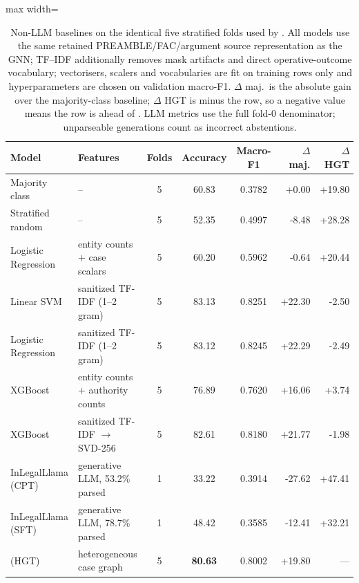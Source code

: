 \begin{table}[!htbp]
\centering
\caption{Non-LLM baselines on the identical five stratified folds used by \method{}. All models use the same retained PREAMBLE/FAC/argument source representation as the GNN; TF--IDF additionally removes mask artifacts and direct operative-outcome vocabulary; vectorisers, scalers and vocabularies are fit on training rows only and hyperparameters are chosen on validation macro-F1. $\Delta$ maj.\ is the absolute gain over the majority-class baseline; $\Delta$ HGT is \method{} minus the row, so a negative value means the row is ahead of \method{}. LLM metrics use the full fold-0 denominator; unparseable generations count as incorrect abstentions.}
\label{tab:non-llm-baselines}
\setlength{\tabcolsep}{4pt}
\renewcommand{\arraystretch}{1.05}
\scriptsize
\begin{adjustbox}{max width=\textwidth}
\begin{tabular}{l l c c c r r}
\toprule
Model & Features & Folds & Accuracy & Macro-F1 & $\Delta$ maj. & $\Delta$ HGT \\
\midrule
Majority class & -- & 5 & 60.83 & 0.3782 & +0.00 & +19.80 \\
Stratified random & -- & 5 & 52.35 & 0.4997 & -8.48 & +28.28 \\
Logistic Regression & entity counts + case scalars & 5 & 60.20 & 0.5962 & -0.64 & +20.44 \\
Linear SVM & sanitized TF-IDF (1--2 gram) & 5 & 83.13 & 0.8251 & +22.30 & -2.50 \\
Logistic Regression & sanitized TF-IDF (1--2 gram) & 5 & 83.12 & 0.8245 & +22.29 & -2.49 \\
XGBoost & entity counts + authority counts & 5 & 76.89 & 0.7620 & +16.06 & +3.74 \\
XGBoost & sanitized TF-IDF $\to$ SVD-256 & 5 & 82.61 & 0.8180 & +21.77 & -1.98 \\
\midrule
InLegalLlama (CPT) & generative LLM, 53.2\% parsed & 1 & 33.22 & 0.3914 & -27.62 & +47.41 \\
InLegalLlama (SFT) & generative LLM, 78.7\% parsed & 1 & 48.42 & 0.3585 & -12.41 & +32.21 \\
\midrule
\method{} (HGT) & heterogeneous case graph & 5 & \textbf{80.63} & 0.8002 & +19.80 & --- \\
\bottomrule
\end{tabular}
\end{adjustbox}
\end{table}
